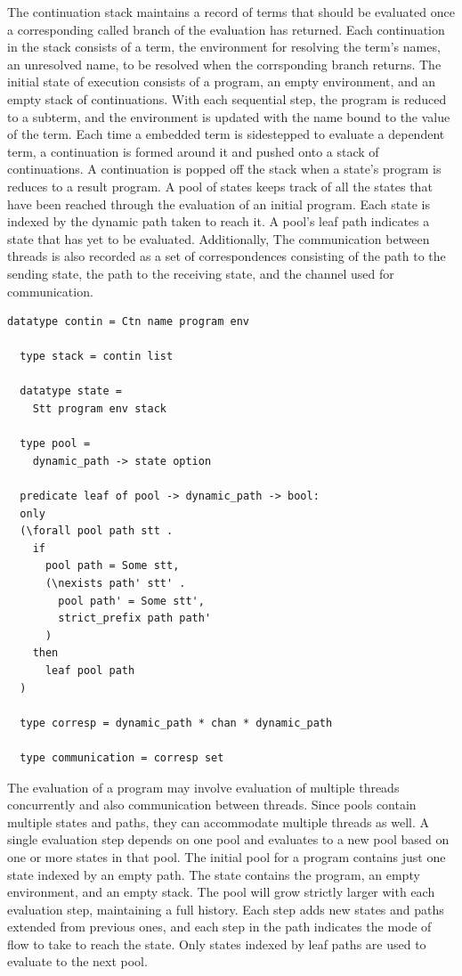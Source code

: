 \documentclass[10pt]{article}
\begin{document}
The continuation stack maintains a record of terms that should be evaluated
once a corresponding called branch of the evaluation has returned.
Each continuation in the stack consists of a term, the environment for resolving the
term's names, an unresolved name, to be resolved when the corrsponding branch returns. 
The initial state of execution consists of a program, an empty environment, and an empty stack
of continuations. With each sequential step, the program is reduced to a subterm,
and the environment is updated with the name bound to the value of the term. Each time a
embedded term is sidestepped to evaluate a dependent term, a continuation is formed around
it and pushed onto a stack of continuations. A continuation is popped off the stack when a
state's program is reduces to a result program.  A pool of states keeps track of all the states
that have been reached through the evaluation of an initial program.  Each state is indexed by
the dynamic path taken to reach it. A pool's leaf path indicates a state that has yet to be
evaluated. Additionally, The communication between threads is also recorded as a set of
correspondences consisting of the path to the sending state, the path to the receiving state,
and the channel used for communication.

\begin{lstlisting}[language=logic, mathescape]
  datatype contin = Ctn name program env

  type stack = contin list

  datatype state =
    Stt program env stack 

  type pool =
    dynamic_path -> state option

  predicate leaf of pool -> dynamic_path -> bool:
  only
  (\forall pool path stt .
    if
      pool path = Some stt,
      (\nexists path' stt' .
        pool path' = Some stt',
        strict_prefix path path'
      )
    then
      leaf pool path
  )

  type corresp = dynamic_path * chan * dynamic_path

  type communication = corresp set 
\end{lstlisting}

The evaluation of a program may involve evaluation of multiple threads concurrently and also
communication between threads. Since pools contain multiple states and paths, they can
accommodate multiple threads as well.  A single evaluation step depends on one pool and
evaluates to a new pool based on one or more states in that pool. The initial pool for a
program contains just one state indexed by an empty path. The state contains the program, an
empty environment, and an empty stack. The pool will grow strictly larger with each evaluation
step, maintaining a full history. Each step adds new states and paths extended from previous
ones, and each step in the path indicates the mode of flow to take to reach the state.
Only states indexed by leaf paths are used to evaluate to the next pool.
\end{document}
